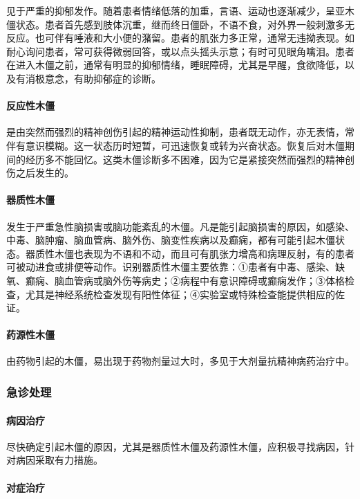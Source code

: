 见于严重的抑郁发作。随着患者情绪低落的加重，言语、运动也逐渐减少，呈亚木僵状态。患者首先感到肢体沉重，继而终日僵卧，不语不食，对外界一般刺激多无反应。也可伴有唾液和大小便的潴留。患者的肌张力多正常，通常无违拗表现。如耐心询问患者，常可获得微弱回答，或以点头摇头示意；有时可见眼角噙泪。患者在进入木僵之前，通常有明显的抑郁情绪，睡眠障碍，尤其是早醒，食欲降低，以及有消极意念，有助抑郁症的诊断。

\paragraph{反应性木僵}

是由突然而强烈的精神创伤引起的精神运动性抑制，患者既无动作，亦无表情，常伴有意识模糊。这一状态历时短暂，可迅速恢复或转为兴奋状态。恢复后对木僵期间的经历多不能回忆。这类木僵诊断多不困难，因为它是紧接突然而强烈的精神创伤之后发生的。

\paragraph{器质性木僵}

发生于严重急性脑损害或脑功能紊乱的木僵。凡是能引起脑损害的原因，如感染、中毒、脑肿瘤、脑血管病、脑外伤、脑变性疾病以及癫痫，都有可能引起木僵状态。器质性木僵也表现为不语和不动，而且可有肌张力增高和病理反射，有的患者可被动进食或排便等动作。识别器质性木僵主要依靠：①患者有中毒、感染、缺氧、癫痫、脑血管病或脑外伤等病史；②病程中有意识障碍或癫痫发作；③体格检查，尤其是神经系统检查发现有阳性体征；④实验室或特殊检查能提供相应的佐证。

\paragraph{药源性木僵}

由药物引起的木僵，易出现于药物剂量过大时，多见于大剂量抗精神病药治疗中。

\subsubsection{急诊处理}

\paragraph{病因治疗}

尽快确定引起木僵的原因，尤其是器质性木僵及药源性木僵，应积极寻找病因，针对病因采取有力措施。

\paragraph{对症治疗}

